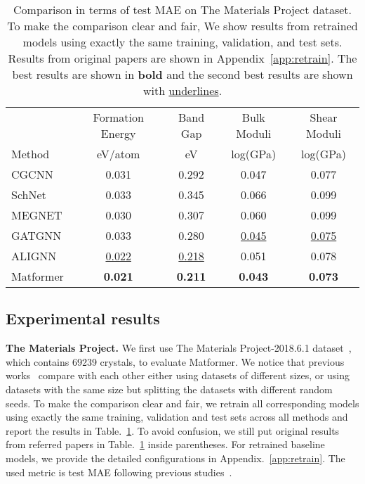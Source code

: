 \documentclass{article}
\begin{document}
\begin{table}[t]
  \vspace{-4mm}
  \caption{Comparison 
in terms of test MAE on The Materials Project dataset. To make the comparison clear and fair, We show results from retrained models using exactly the same training, validation, and test sets. 
Results from original papers are shown in Appendix~\ref{app:retrain}. The best results are shown in \textbf{bold} and the second best results are shown with \uline{underlines}.}
  \label{mp-table}
  \centering
  \begin{tabular}{lcccc}
    \toprule
    & Formation Energy & Band Gap & Bulk Moduli & Shear Moduli \\
    \cmidrule(r){2-5}
    Method & eV/atom  &  eV &   log(GPa) & log(GPa)  \\
    \midrule
    CGCNN~\citep{cgcnn} & 0.031 & 0.292  & 0.047 &0.077 \\
    SchNet~\citep{schnet} & 0.033 & 0.345 & 0.066 & 0.099 \\
    MEGNET~\citep{megnet} & 0.030 & 0.307 & 0.060 & 0.099 \\
    GATGNN~\citep{gatgnn} & 0.033 & 0.280 & \uline{0.045} & \uline{0.075} \\
    ALIGNN~\citep{alignn} & \uline{0.022} & \uline{0.218} & 0.051 & 0.078 \\
    Matformer & \textbf{0.021} & \textbf{0.211} & \textbf{0.043} & \textbf{0.073} \\
    \bottomrule
  \end{tabular}
  \vspace{-4mm}
\end{table}






\subsection{Experimental results}
\label{sec:materialsproj}
\textbf{The Materials Project.} We first use The Materials Project-2018.6.1 dataset~\citep{megnet}, which contains 69239 crystals, to evaluate Matformer. 
We notice that previous works~\citep{cgcnn, schnet,megnet,gatgnn,alignn} compare with each other
either using datasets of different sizes,
or using datasets with the same size but splitting the datasets with different random seeds.
To make the comparison clear and fair, we retrain all corresponding models using exactly the same training, validation and test sets across all methods
and report the results in Table.~\ref{mp-table}. To avoid confusion, we still put original results from referred papers in Table.~\ref{mp-table} inside parentheses. For retrained baseline models, we provide the detailed configurations in Appendix.~\ref{app:retrain}. The used metric is test MAE following previous studies~\citep{cgcnn, schnet,megnet,gatgnn,alignn}. 
\end{document}
